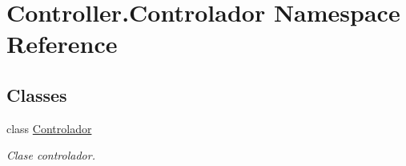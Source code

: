 \hypertarget{namespace_controller_1_1_controlador}{}\section{Controller.\+Controlador Namespace Reference}
\label{namespace_controller_1_1_controlador}
\subsection*{Classes}
\begin{DoxyCompactItemize}
\item 
class \hyperlink{class_controller_1_1_controlador_1_1_controlador}{Controlador}
\begin{DoxyCompactList}\small\item\em Clase controlador. \end{DoxyCompactList}\end{DoxyCompactItemize}

